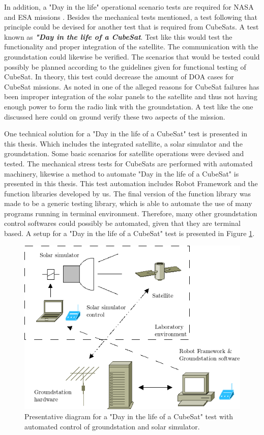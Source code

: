 \documentclass[english,12pt,a4paper,pdftex,elec,utf8]{aaltothesis}
\begin{document}
In addition, a "Day in the life" operational scenario tests are required for NASA and ESA missions \cite{tor}. Besides the mechanical tests mentioned, a test following that principle could be devised for another test that is required from CubeSats. A test known as \textbf{\textit{"Day in the life of a CubeSat}}. Test like this would test the functionality and proper integration of the satellite. The communication with the groundstation could likewise be verified. The scenarios that would be tested could possibly be planned according to the guidelines given for functional testing of CubeSat. In theory, this test could decrease the amount of DOA cases for CubeSat missions. As noted in \cite{Swart1, Langer} one of the alleged reasons for CubeSat failures has been improper integration of the solar panels to the satellite and thus not having enough power to form the radio link with the groundstation. A test like the one discussed here could on ground verify these two aspects of the mission.\par
One technical solution for a "Day in the life of a CubeSat" test is presented in this thesis. Which includes the integrated satellite, a solar simulator and the groundstation. Some basic scenarios for satellite operations were devised and tested. The mechanical stress tests for CubeSats are performed with automated machinery, likewise a method to automate "Day in the life of a CubeSat" is presented in this thesis. This test automation includes Robot Framework and the function libraries developed by us. The final version of the function library was made to be a generic testing library, which is able to automate the use of many programs running in terminal environment. Therefore, many other groundstation control softwares could possibly be automated, given that they are terminal based. A setup for a "Day in the life of a CubeSat" test is presented in Figure \ref{dayinlifediagram}.\par
\begin{figure}[h!]
\centering
\includegraphics[scale=0.6]{dayinlifesetupdiagram}
\caption{Presentative diagram for a "Day in the life of a CubeSat" test with automated control of groundstation and solar simulator.}
\label{dayinlifediagram}
\end{figure}   
\end{document}
